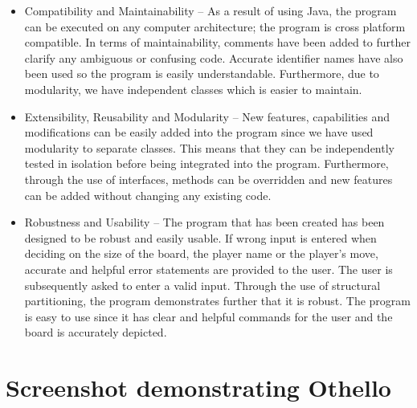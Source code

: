 \documentclass[a4wide, 11pt]{article}
\begin{document}
\begin{itemize}

    \item Compatibility and Maintainability – As a result of using Java, the program can be executed on any computer architecture; the program is cross platform compatible. In terms of maintainability, comments have been added to further clarify any ambiguous or confusing code. Accurate identifier names have also been used so the program is easily understandable. Furthermore, due to modularity, we have independent classes which is easier to maintain.

   \item Extensibility, Reusability and Modularity – New features, capabilities and modifications can be easily added into the program since we have used modularity to separate classes. This means that they can be independently tested in isolation before being integrated into the program. Furthermore, through the use of interfaces, methods can be overridden and new features can be added without changing any existing code. 

   \item Robustness and Usability – The program that has been created has been designed to be robust and easily usable. If wrong input is entered when deciding on the size of the board, the player name or the player's move, accurate and helpful error statements are provided to the user. The user is subsequently asked to enter a valid input. Through the use of structural partitioning, the program demonstrates further that it is robust. The program is easy to use since it has clear and helpful commands for the user and the board is accurately depicted. 
 
\end{itemize}

\section{Screenshot demonstrating Othello}
\end{document}
